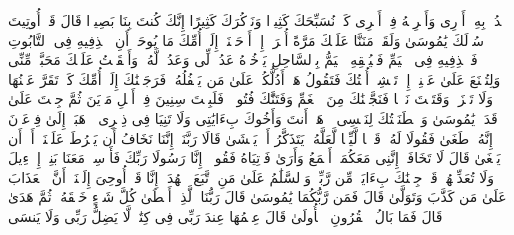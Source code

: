 \startbuffer[\q:20:31]
ٱشۡدُدۡ بِهِۦۤ أَزۡرِی%
\stopbuffer%
\startbuffer[\q:20:32]
وَأَشۡرِكۡهُ فِیۤ أَمۡرِی%
\stopbuffer%
\startbuffer[\q:20:33]
كَیۡ نُسَبِّحَكَ كَثِیرࣰا%
\stopbuffer%
\startbuffer[\q:20:34]
وَنَذۡكُرَكَ كَثِیرًا%
\stopbuffer%
\startbuffer[\q:20:35]
إِنَّكَ كُنتَ بِنَا بَصِیرࣰا%
\stopbuffer%
\startbuffer[\q:20:36]
قَالَ قَدۡ أُوتِیتَ سُؤۡلَكَ یَٰمُوسَىٰ%
\stopbuffer%
\startbuffer[\q:20:37]
وَلَقَدۡ مَنَنَّا عَلَیۡكَ مَرَّةً أُخۡرَىٰۤ%
\stopbuffer%
\startbuffer[\q:20:38]
إِذۡ أَوۡحَیۡنَاۤ إِلَىٰۤ أُمِّكَ مَا یُوحَىٰۤ%
\stopbuffer%
\startbuffer[\q:20:39]
أَنِ ٱقۡذِفِیهِ فِی ٱلتَّابُوتِ فَٱقۡذِفِیهِ فِی ٱلۡیَمِّ فَلۡیُلۡقِهِ ٱلۡیَمُّ بِٱلسَّاحِلِ یَأۡخُذۡهُ عَدُوࣱّ لِّی وَعَدُوࣱّ لَّهُۥۚ وَأَلۡقَیۡتُ عَلَیۡكَ مَحَبَّةࣰ مِّنِّی وَلِتُصۡنَعَ عَلَىٰ عَیۡنِیۤ%
\stopbuffer%
\startbuffer[\q:20:40]
إِذۡ تَمۡشِیۤ أُخۡتُكَ فَتَقُولُ هَلۡ أَدُلُّكُمۡ عَلَىٰ مَن یَكۡفُلُهُۥۖ فَرَجَعۡنَٰكَ إِلَىٰۤ أُمِّكَ كَیۡ تَقَرَّ عَیۡنُهَا وَلَا تَحۡزَنَۚ وَقَتَلۡتَ نَفۡسࣰا فَنَجَّیۡنَٰكَ مِنَ ٱلۡغَمِّ وَفَتَنَّٰكَ فُتُونࣰاۚ فَلَبِثۡتَ سِنِینَ فِیۤ أَهۡلِ مَدۡیَنَ ثُمَّ جِئۡتَ عَلَىٰ قَدَرࣲ یَٰمُوسَىٰ%
\stopbuffer%
\startbuffer[\q:20:41]
وَٱصۡطَنَعۡتُكَ لِنَفۡسِی%
\stopbuffer%
\startbuffer[\q:20:42]
ٱذۡهَبۡ أَنتَ وَأَخُوكَ بِءَایَٰتِی وَلَا تَنِیَا فِی ذِكۡرِی%
\stopbuffer%
\startbuffer[\q:20:43]
ٱذۡهَبَاۤ إِلَىٰ فِرۡعَوۡنَ إِنَّهُۥ طَغَىٰ%
\stopbuffer%
\startbuffer[\q:20:44]
فَقُولَا لَهُۥ قَوۡلࣰا لَّیِّنࣰا لَّعَلَّهُۥ یَتَذَكَّرُ أَوۡ یَخۡشَىٰ%
\stopbuffer%
\startbuffer[\q:20:45]
قَالَا رَبَّنَاۤ إِنَّنَا نَخَافُ أَن یَفۡرُطَ عَلَیۡنَاۤ أَوۡ أَن یَطۡغَىٰ%
\stopbuffer%
\startbuffer[\q:20:46]
قَالَ لَا تَخَافَاۤۖ إِنَّنِی مَعَكُمَاۤ أَسۡمَعُ وَأَرَىٰ%
\stopbuffer%
\startbuffer[\q:20:47]
فَأۡتِیَاهُ فَقُولَاۤ إِنَّا رَسُولَا رَبِّكَ فَأَرۡسِلۡ مَعَنَا بَنِیۤ إِسۡرَٰۤءِیلَ وَلَا تُعَذِّبۡهُمۡۖ قَدۡ جِئۡنَٰكَ بِءَایَةࣲ مِّن رَّبِّكَۖ وَٱلسَّلَٰمُ عَلَىٰ مَنِ ٱتَّبَعَ ٱلۡهُدَىٰۤ%
\stopbuffer%
\startbuffer[\q:20:48]
إِنَّا قَدۡ أُوحِیَ إِلَیۡنَاۤ أَنَّ ٱلۡعَذَابَ عَلَىٰ مَن كَذَّبَ وَتَوَلَّىٰ%
\stopbuffer%
\startbuffer[\q:20:49]
قَالَ فَمَن رَّبُّكُمَا یَٰمُوسَىٰ%
\stopbuffer%
\startbuffer[\q:20:50]
قَالَ رَبُّنَا ٱلَّذِیۤ أَعۡطَىٰ كُلَّ شَیۡءٍ خَلۡقَهُۥ ثُمَّ هَدَىٰ%
\stopbuffer%
\startbuffer[\q:20:51]
قَالَ فَمَا بَالُ ٱلۡقُرُونِ ٱلۡأُولَىٰ%
\stopbuffer%
\startbuffer[\q:20:52]
قَالَ عِلۡمُهَا عِندَ رَبِّی فِی كِتَٰبࣲۖ لَّا یَضِلُّ رَبِّی وَلَا یَنسَى%
\stopbuffer%
